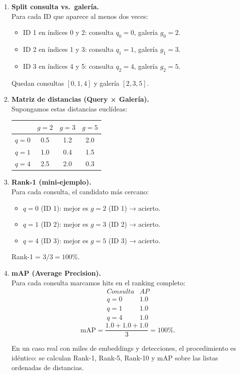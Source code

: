 \documentclass[12pt, a4paper, twoside]{article}
\begin{document}
 	\begin{enumerate}
 		\item \textbf{Split consulta vs.\ galería.}\\
 		Para cada ID que aparece al menos dos veces:
 		\begin{itemize}
 			\item ID 1 en índices 0 y 2: consulta $q_0=0$, galería $g_0=2$.
 			\item ID 2 en índices 1 y 3: consulta $q_1=1$, galería $g_1=3$.
 			\item ID 3 en índices 4 y 5: consulta $q_2=4$, galería $g_2=5$.
 		\end{itemize}
 		Quedan consultas $[0,1,4]$ y galería $[2,3,5]$.
 		
 		\item \textbf{Matriz de distancias (Query × Galería).}\\
 		Supongamos estas distancias euclídeas:
 		\begin{center}
 			\begin{tabular}{c|ccc}
 				& $g=2$ & $g=3$ & $g=5$ \\ \hline
 				$q=0$ & 0.5 & 1.2 & 2.0 \\
 				$q=1$ & 1.0 & 0.4 & 1.5 \\
 				$q=4$ & 2.5 & 2.0 & 0.3
 			\end{tabular}
 		\end{center}
 		
 		\item \textbf{Rank-1 (mini-ejemplo).}\\
 		Para cada consulta, el candidato más cercano:
 		\begin{itemize}
 			\item $q=0$ (ID 1): mejor es $g=2$ (ID 1) → acierto.
 			\item $q=1$ (ID 2): mejor es $g=3$ (ID 2) → acierto.
 			\item $q=4$ (ID 3): mejor es $g=5$ (ID 3) → acierto.
 		\end{itemize}
 		Rank-1 = $3/3 = 100\%$.
 		
 		\item \textbf{mAP (Average Precision).}\\
 		Para cada consulta marcamos hits en el ranking completo:
 		\[
 		\begin{array}{l|c}
 			Consulta & AP \\ \hline
 			q=0 & 1.0 \\
 			q=1 & 1.0 \\
 			q=4 & 1.0
 		\end{array}
 		\]
 		\[
 		\mathrm{mAP} = \frac{1.0 + 1.0 + 1.0}{3} = 100\%.
 		\]
 		
 		En un caso real con miles de embeddings y detecciones, el procedimiento es idéntico: 
 		se calculan Rank-1, Rank-5, Rank-10 y mAP sobre las listas ordenadas de distancias.
 	\end{enumerate}
 	
\end{document}
